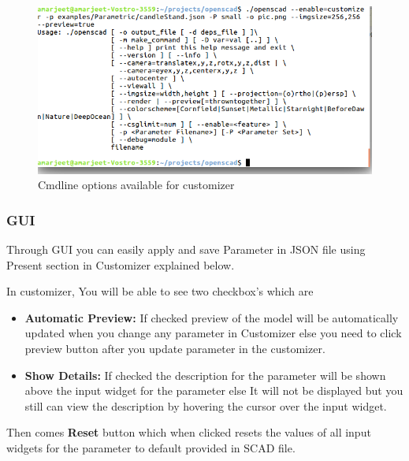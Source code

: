 \begin{figure}
    \centering \includegraphics[width=\linewidth]{images/output/8.png}
    \caption{Cmdline options available for customizer}
    \label{fig:7}
\end{figure}

\subsubsection{GUI}

Through GUI you can easily apply and save Parameter in JSON file using Present section in Customizer explained below.

In customizer, You will be able to see two checkbox’s which are
\begin{itemize}
\item \textbf{Automatic Preview:}
If checked preview of the model will be automatically updated when you change any parameter in Customizer else you need to click preview button after you update parameter in the customizer.
\item \textbf{Show Details:}
If checked the description for the parameter will be shown above the input widget for the parameter else It will not be displayed but you still can view the description by hovering the cursor over the input widget.
\end{itemize}
Then comes \textbf{Reset} button which when clicked resets the values of all input widgets for the parameter to default provided in SCAD file.

